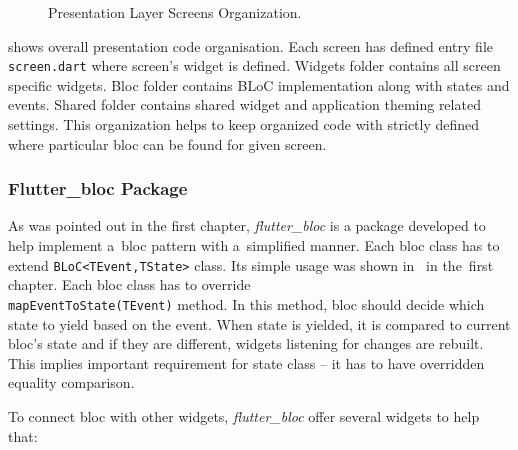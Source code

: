 \begin{figure}[ht]
    \caption{Presentation Layer Screens Organization.}
    \label{fig:ct-pres-organis}
\end{figure}

 shows overall presentation code organisation. Each screen has defined entry file \verb|screen.dart| where screen's widget is defined. Widgets folder contains all screen specific widgets. Bloc folder contains BLoC implementation along with states and events. Shared folder contains shared widget and application theming related settings. This organization helps to keep organized code with strictly defined where particular \gls{bloc} can be found for given screen. 

\subsubsection{Flutter\_bloc Package}
As was pointed out in the first chapter, \textit{flutter\_bloc} is a package developed to help implement a~\gls{bloc} pattern with a~simplified manner. Each \gls{bloc} class has to extend \verb|BLoC<TEvent,TState>| class. Its simple usage was shown in~ in the~first chapter. Each \gls{bloc} class has to override \\ \verb|mapEventToState(TEvent)| method. In this method, \gls{bloc} should decide which state to yield based on the event. When state is yielded, it is compared to current \gls{bloc}'s state and if they are different, widgets listening for changes are rebuilt. This implies important requirement for state class -- it has to have overridden equality comparison. 

To connect \gls{bloc} with other widgets, \textit{flutter\_bloc} offer several widgets to help that:

